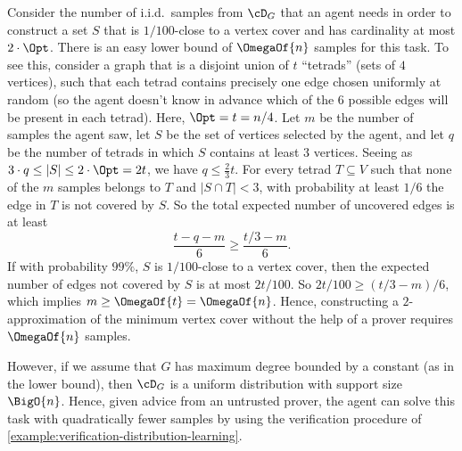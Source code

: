 \begin{example}
	Consider the number of i.i.d.\ samples from $\cD_G$ that an agent needs in order to construct a set $S$ that is $1/100$-close to a vertex cover and has cardinality at most $2\cdot\Opt$. There is an easy lower bound of $\OmegaOf{n}$ samples for this task. To see this, consider a graph that is a disjoint union of $t$ ``tetrads'' (sets of $4$ vertices), such that each tetrad contains precisely one edge chosen uniformly at random (so the agent doesn't know in advance which of the $6$ possible edges will be present in each tetrad). Here, $\Opt = t = n/4$. Let $m$ be the number of samples the agent saw, let $S$ be the set of vertices selected by the agent, and let $q$ be the number of tetrads in which $S$ contains at least $3$ vertices. Seeing as $3\cdot q \leq |S| \leq 2\cdot\Opt = 2t$, we have $q \leq \frac{2}{3}t$. For every tetrad $T \subseteq V$ such that none of the $m$ samples belongs to $T$ and $|S\cap T| < 3$, with probability at least $1/6$ the edge in $T$ is not covered by $S$. So the total expected number of uncovered edges is at least
	\[
		\frac{t - q - m}{6} \geq \frac{t/3 - m}{6}.
	\]
	If with probability $99\%$, $S$ is $1/100$-close to a vertex cover, then the expected number of edges not covered by $S$ is at most $2t/100$. So $2t/100 \geq (t/3 - m)/6$, which implies $m \geq \OmegaOf{t} = \OmegaOf{n}$. Hence, constructing a $2$-approximation of the minimum vertex cover without the help of a prover requires $\OmegaOf{n}$ samples.

	However, if we assume that $G$ has maximum degree bounded by a constant (as in the lower bound), then $\cD_G$ is a uniform distribution with support size $\BigO{n}$. Hence, given advice from an untrusted prover, the agent can solve this task with quadratically fewer samples by using the verification procedure of \cref{example:verification-distribution-learning}.


\end{example}
